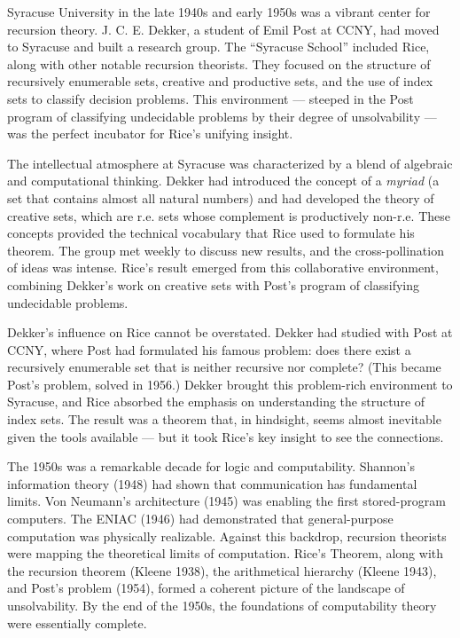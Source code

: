Syracuse University in the late 1940s and early 1950s was a vibrant center for recursion theory. J. C. E. Dekker, a student of Emil Post at CCNY, had moved to Syracuse and built a research group. The ``Syracuse School'' included Rice, along with other notable recursion theorists. They focused on the structure of recursively enumerable sets, creative and productive sets, and the use of index sets to classify decision problems. This environment --- steeped in the Post program of classifying undecidable problems by their degree of unsolvability --- was the perfect incubator for Rice's unifying insight.

The intellectual atmosphere at Syracuse was characterized by a blend of algebraic and computational thinking. Dekker had introduced the concept of a \emph{myriad} (a set that contains almost all natural numbers) and had developed the theory of creative sets, which are r.e. sets whose complement is productively non-r.e. These concepts provided the technical vocabulary that Rice used to formulate his theorem. The group met weekly to discuss new results, and the cross-pollination of ideas was intense. Rice's result emerged from this collaborative environment, combining Dekker's work on creative sets with Post's program of classifying undecidable problems.

Dekker's influence on Rice cannot be overstated. Dekker had studied with Post at CCNY, where Post had formulated his famous problem: does there exist a recursively enumerable set that is neither recursive nor complete? (This became Post's problem, solved in 1956.) Dekker brought this problem-rich environment to Syracuse, and Rice absorbed the emphasis on understanding the structure of index sets. The result was a theorem that, in hindsight, seems almost inevitable given the tools available --- but it took Rice's key insight to see the connections.

The 1950s was a remarkable decade for logic and computability. Shannon's information theory (1948) had shown that communication has fundamental limits. Von Neumann's architecture (1945) was enabling the first stored-program computers. The ENIAC (1946) had demonstrated that general-purpose computation was physically realizable. Against this backdrop, recursion theorists were mapping the theoretical limits of computation. Rice's Theorem, along with the recursion theorem (Kleene 1938), the arithmetical hierarchy (Kleene 1943), and Post's problem (1954), formed a coherent picture of the landscape of unsolvability. By the end of the 1950s, the foundations of computability theory were essentially complete.

